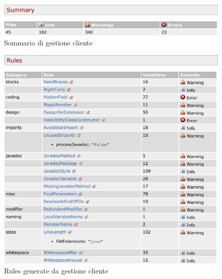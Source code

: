 \begin{figure}[htbp]
	\centering
	\includegraphics[scale=0.6]{iterazione1/images/Cs_Summary_Gestione_Cliente.jpg}
	\caption{Sommario di gestione cliente\label{fig:Cs_Summary_Gestione_Cliente}}
\end{figure}

\begin{figure}[htbp]
	\centering
	\includegraphics[scale=0.8]{iterazione1/images/Cs_rules_Gestione_Cliente.jpg}
	\caption{Rules generate da gestione cliente\label{fig:Cs_Rules_Gestione_Cliente}}
\end{figure}

